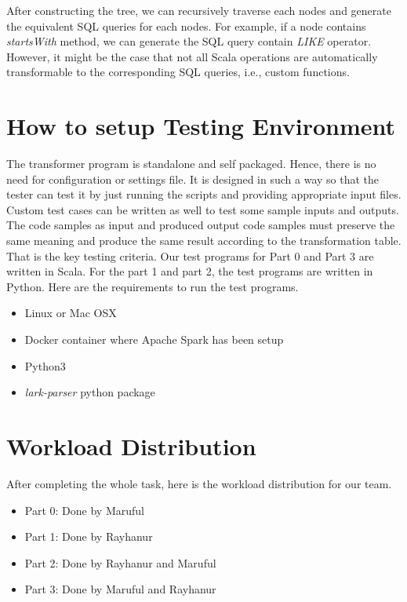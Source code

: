 \documentclass[sigplan]{acmart}\settopmatter{printfolios=true,printccs=false,printacmref=false}
\begin{document}
After constructing the tree, we can recursively traverse each nodes and generate the equivalent SQL queries for each nodes. For example, if a node contains \textit{startsWith} method, we can generate the SQL query contain \textit{LIKE} operator. However, it might be the case that not all Scala operations are automatically transformable to the corresponding SQL queries, i.e., custom functions. 

\section{How to setup Testing Environment}
The transformer program is standalone and self packaged. Hence, there is no need for configuration or settings file. It is designed in such a way so that the tester can test it by just running the scripts and providing appropriate input files. Custom test cases can be written as well to test some sample inputs and outputs. The code samples as input and produced output code samples must preserve the same meaning and produce the same result according to the transformation table. That is the key testing criteria. Our test programs for Part 0 and Part 3 are written in Scala. For the part 1 and part 2, the test programs are written in Python. Here are the requirements to run the test programs.

\begin{itemize}
    \item Linux or Mac OSX
    \item Docker container where Apache Spark has been setup
    \item Python3
    \item \textit{lark-parser} python package 
\end{itemize}

\section{Workload Distribution}
After completing the whole task, here is the workload distribution for our team.
\begin{itemize}
    \item Part 0: Done by Maruful
    \item Part 1: Done by Rayhanur
    \item Part 2: Done by Rayhanur and Maruful
    \item Part 3: Done by Maruful and Rayhanur
\end{itemize}












%
%
\end{document}
